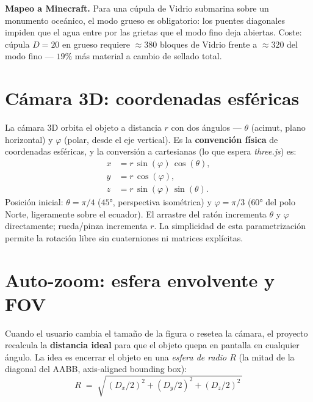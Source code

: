 \documentclass[12pt,a4paper]{scrartcl}
\newcommand{\acc}[1]{\textcolor{accent}{\textbf{#1}}}
\begin{document}
\begin{minec}
\textbf{Mapeo a Minecraft.} Para una cúpula de Vidrio submarina sobre un monumento oceánico, el modo grueso es obligatorio: los puentes diagonales impiden que el agua entre por las grietas que el modo fino deja abiertas. Coste: cúpula $D=20$ en grueso requiere $\approx 380$ bloques de Vidrio frente a $\approx 320$ del modo fino --- $19\%$ más material a cambio de sellado total.
\end{minec}

\section{Cámara 3D: coordenadas esféricas}

La cámara 3D orbita el objeto a distancia $r$ con dos ángulos --- $\theta$ (acimut, plano horizontal) y $\varphi$ (polar, desde el eje vertical). Es la \acc{convención física} de coordenadas esféricas, y la conversión a cartesianas (lo que espera \emph{three.js}) es:
\[
\begin{aligned}
x &= r\,\sin(\varphi)\,\cos(\theta), \\
y &= r\,\cos(\varphi), \\
z &= r\,\sin(\varphi)\,\sin(\theta).
\end{aligned}
\]
Posición inicial: $\theta = \pi/4$ ($45°$, perspectiva isométrica) y $\varphi = \pi/3$ ($60°$ del polo Norte, ligeramente sobre el ecuador). El arrastre del ratón incrementa $\theta$ y $\varphi$ directamente; rueda/pinza incrementa $r$. La simplicidad de esta parametrización permite la rotación libre sin cuaterniones ni matrices explícitas.

\section{Auto-zoom: esfera envolvente y FOV}

Cuando el usuario cambia el tamaño de la figura o resetea la cámara, el proyecto recalcula la \acc{distancia ideal} para que el objeto quepa en pantalla en cualquier ángulo. La idea es encerrar el objeto en una \emph{esfera de radio $R$} (la mitad de la diagonal del AABB, axis-aligned bounding box):
\[
R \;=\; \sqrt{\,(D_x/2)^2 + (D_y/2)^2 + (D_z/2)^2\,}
\]
\end{document}
